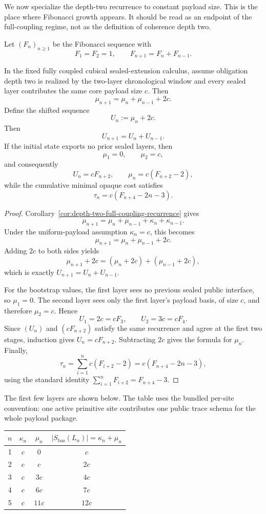 We now specialize the depth-two recurrence to constant payload size.  This is the place where
Fibonacci growth appears.  It should be read as an endpoint of the full-coupling regime, not
as the definition of coherence depth two.

Let \((F_n)_{n\geq 1}\) be the Fibonacci sequence with
\[
  F_1=F_2=1,
  \qquad
  F_{n+1}=F_n+F_{n-1}.
\]

\begin{corollary}
\label{cor:affine-fibonacci-envelope}
In the fixed fully coupled cubical sealed-extension calculus, assume obligation depth two is
realized by the two-layer chronological window and every sealed layer contributes the same
core payload size \(c\).  Then
\[
  \mu_{n+1}=\mu_n+\mu_{n-1}+2c.
\]
Define the shifted sequence
\[
  U_n := \mu_n+2c.
\]
Then
\[
  U_{n+1}=U_n+U_{n-1}.
\]
If the initial state exports no prior sealed layers, then
\[
  \mu_1=0,
  \qquad
  \mu_2=c,
\]
and consequently
\[
  U_n=cF_{n+2},
  \qquad
  \mu_n=c(F_{n+2}-2),
\]
while the cumulative minimal opaque cost satisfies
\[
  \tau_n=c(F_{n+4}-2n-3).
\]
\end{corollary}

\begin{proof}
Corollary~\ref{cor:depth-two-full-coupling-recurrence} gives
\[
  \mu_{n+1}
  =
  \mu_n+\mu_{n-1}+\kappa_n+\kappa_{n-1}.
\]
Under the uniform-payload assumption \(\kappa_n=c\), this becomes
\[
  \mu_{n+1}=\mu_n+\mu_{n-1}+2c.
\]
Adding \(2c\) to both sides yields
\[
  \mu_{n+1}+2c
  =
  (\mu_n+2c)+(\mu_{n-1}+2c),
\]
which is exactly \(U_{n+1}=U_n+U_{n-1}\).

For the bootstrap values, the first layer sees no previous sealed public interface, so
\(\mu_1=0\).  The second layer sees only the first layer's payload basis, of size \(c\), and
therefore \(\mu_2=c\).  Hence
\[
  U_1=2c=cF_3,
  \qquad
  U_2=3c=cF_4.
\]
Since \((U_n)\) and \((cF_{n+2})\) satisfy the same recurrence and agree at the first two
stages, induction gives \(U_n=cF_{n+2}\).  Subtracting \(2c\) gives the formula for
\(\mu_n\).  Finally,
\[
  \tau_n
  =
  \sum_{i=1}^{n} c(F_{i+2}-2)
  =
  c(F_{n+4}-2n-3),
\]
using the standard identity \(\sum_{i=1}^n F_{i+2}=F_{n+4}-3\).
\end{proof}

The first few layers are shown below.  The table uses the bundled per-site convention: one
active primitive site contributes one public trace schema for the whole payload package.

\begin{center}
\begin{tabular}{c c c c}
\hline
\(n\) & \(\kappa_n\) & \(\mu_n\) & \(|S_{\mathrm{bas}}(L_n)|=\kappa_n+\mu_n\) \\
\hline
1 & \(c\) & \(0\) & \(c\) \\
2 & \(c\) & \(c\) & \(2c\) \\
3 & \(c\) & \(3c\) & \(4c\) \\
4 & \(c\) & \(6c\) & \(7c\) \\
5 & \(c\) & \(11c\) & \(12c\) \\
\hline
\end{tabular}
\end{center}

